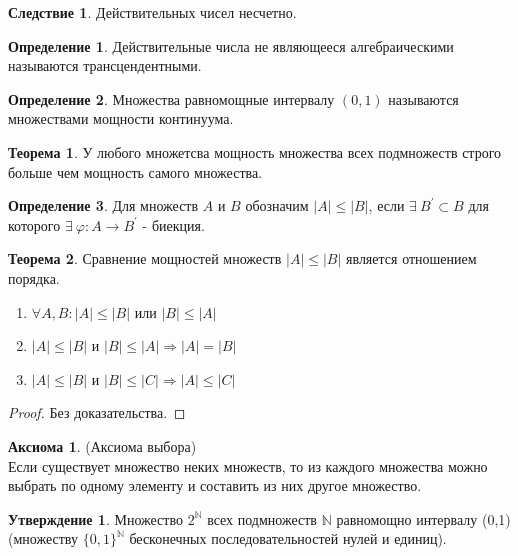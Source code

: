 \documentclass[a4paper, 12pt]{article}
\newcommand{\N}{\mathbb{N}}
\renewcommand{\phi}{\varphi}
\theoremstyle{definition}
\newtheorem*{definition}{Определение}
\newtheorem*{theorem}{Теорема}
\newtheorem*{consequense}{Следствие}
\newtheorem*{statement}{Утверждение}
\newtheorem*{axiom}{Аксиома}
\begin{document}
        \begin{consequense}
            Действительных чисел несчетно.
        \end{consequense} 
        \begin{definition}
            Действительные числа не являющееся алгебраическими называются трансцендентными.
        \end{definition} 
        \begin{definition}
            Множества равномощные интервалу $(0,1)$ называются множествами мощности континуума.
        \end{definition} 
        \begin{theorem}
            У любого множетсва мощность множества всех подмножеств строго больше чем мощность самого множества.
        \end{theorem}
        \begin{definition}
            Для множеств $A$ и $B$ обозначим $|A|\leq |B|$, если $\exists \ B^{\prime} \subset B$ для которого $\exists \ \phi:A\to B^{\prime}$ - биекция.
        \end{definition} 
        \begin{theorem}
            Сравнение мощностей множеств $|A|\leq |B|$ является отношением порядка.
            \begin{enumerate}
                \item $\forall A,B: |A|\leq |B|$ или $|B|\leq |A|$ 
                \item $|A|\leq |B|$ и $|B|\leq |A| \Rightarrow |A|=|B|$
                \item $|A|\leq |B|$ и $|B|\leq |C| \Rightarrow |A|\leq |C|$
            \end{enumerate}
        \end{theorem}
        \begin{proof}
            Без доказательства.
        \end{proof}
        \begin{axiom}(Аксиома выбора)\\
            Если существует множество неких множеств, то из каждого множества можно выбрать по одному элементу и составить из них другое множество.
        \end{axiom}
        \begin{statement}
            Множество $2^{\N}$ всех подмножеств $\N$ равномощно интервалу (0,1) (множеству $\{0,1\}^{\N}$ бесконечных последовательностей нулей и единиц).
        \end{statement}
\end{document}
